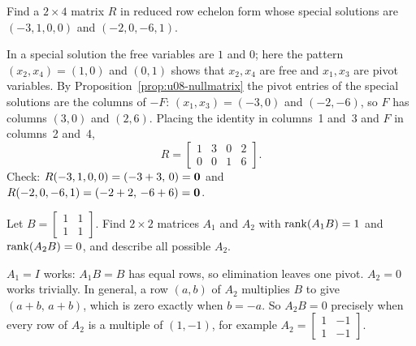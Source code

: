 \begin{exercise}\label{exr:u08-reverse}
Find a $2\times 4$ matrix $R$ in reduced row echelon form whose special solutions are
$(-3,1,0,0)$ and $(-2,0,-6,1)$.
\end{exercise}
\begin{solution}
In a special solution the free variables are $1$ and $0$; here the pattern
$(x_2,x_4)=(1,0)$ and $(0,1)$ shows that $x_2,x_4$ are free and $x_1,x_3$ are pivot variables.
By Proposition~\ref{prop:u08-nullmatrix} the pivot entries of the special solutions are the
columns of $-F$: $(x_1,x_3)=(-3,0)$ and $(-2,-6)$, so $F$ has columns $(3,0)$ and $(2,6)$.
Placing the identity in columns~1 and~3 and $F$ in columns~2 and~4,
\[
R=\begin{bmatrix}1&3&0&2\\0&0&1&6\end{bmatrix}.
\]
Check: $R(-3,1,0,0)=(-3+3,\,0)=\boldsymbol{0}$ and $R(-2,0,-6,1)=(-2+2,\,-6+6)=\boldsymbol{0}$.
\end{solution}

\begin{exercise}\label{exr:u08-rankAB}
Let $B=\begin{bmatrix}1&1\\1&1\end{bmatrix}$. Find $2\times2$ matrices $A_1$ and $A_2$ with
$\operatorname{rank}(A_1B)=1$ and $\operatorname{rank}(A_2B)=0$, and describe all possible $A_2$.
\end{exercise}
\begin{solution}
$A_1=I$ works: $A_1B=B$ has equal rows, so elimination leaves one pivot. $A_2=0$ works
trivially. In general, a row $(a,b)$ of $A_2$ multiplies $B$ to give $(a+b,\,a+b)$, which is zero
exactly when $b=-a$. So $A_2B=0$ precisely when every row of $A_2$ is a multiple of $(1,-1)$, for
example $A_2=\begin{bmatrix}1&-1\\1&-1\end{bmatrix}$.
\end{solution}
